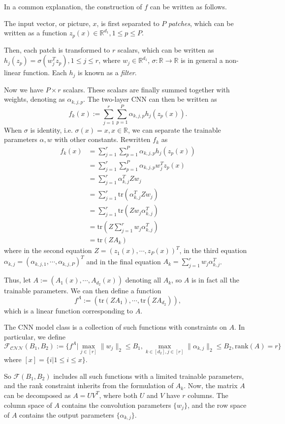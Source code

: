 \documentclass{article}
\begin{document}
In a common explanation, the construction of $f$ can be written as follows.

The input vector, or picture, $x$, is first separated to $P$ \emph{patches}, which can be written as a function $z_p(x)\in\mathbb{R}^{d_1},1\leq p\leq P$.

Then, each patch is transformed to $r$ scalars, which can be written as $h_j(z_p)=\sigma(w_j^Tz_p),1\leq j\leq r$, where $w_j\in\mathbb{R}^{d_1}$, $\sigma:\mathbb{R}\rightarrow\mathbb{R}$ is in general a non-linear function. Each $h_j$ is known as a \emph{filter}.

Now we have $P\times r$ scalars. These scalars are finally summed together with weights, denoting as $\alpha_{k,j,p}$. The two-layer CNN can then be written as
\[f_k(x):=\sum_{j=1}^{r}\sum_{p=1}^{P}\alpha_{k,j,p}h_j(z_p(x)).\]
When $\sigma$ is identity, i.e. $\sigma(x)=x,x\in\mathbb{R}$, we can separate the trainable parameters $\alpha,w$ with other constants. Rewritten $f_k$ as
\begin{align*}
f_k(x)&=\sum_{j=1}^{r}\sum_{p=1}^{P}\alpha_{k,j,p}h_j(z_p(x))\\
&=\sum_{j=1}^{r}\sum_{p=1}^{P}\alpha_{k,j,p}w_j^Tz_p(x)\\
&=\sum_{j=1}^{r}\alpha_{k,j}^TZw_j\\
&=\sum_{j=1}^{r}\text{tr}(\alpha_{k,j}^TZw_j)\\
&=\sum_{j=1}^{r}\text{tr}(Zw_j\alpha_{k,j}^T)\\
&=\text{tr}(Z\sum_{j=1}^{r}w_j\alpha_{k,j}^T)\\
&=\text{tr}(ZA_k)
\end{align*}
where in the second equation $Z=(z_1(x),\cdots,z_P(x))^T$, in the third equation $\alpha_{k,j}=(\alpha_{k,j,1},\cdots,\alpha_{k,j,P})^T$ and in the final equation $A_k=\sum_{j=1}^{r}w_j\alpha_{k,j}^T$.

Thus, let $A:=(A_1(x),\cdots,A_{d_2}(x))$ denoting all $A_k$, so $A$ is in fact all the trainable parameters. We can then define a function \[f^A:=(\text{tr}(ZA_1),\cdots,\text{tr}(ZA_{d_2})),\] which is a linear function corresponding to $A$.

The CNN model class is a collection of such functions with constraints on $A$. In particular, we define
\[\mathcal{F_{\text{CNN}}}(B_1,B_2):=\lbrace f^A|\max_{j\in[r]}\|w_j\|_2\leq B_1, \max_{k\in[d_2],j\in[r]}\|\alpha_{k,j}\|_2\leq B_2,\text{rank}(A)=r \rbrace\]
where $[x]=\lbrace i|1\leq i\leq x\rbrace.$

So $\mathcal{F}(B_1,B_2)$ includes all such functions with a limited trainable parameters, and the rank constraint inherits from the formulation of $A_k$. Now, the matrix $A$ can be decomposed as $A=UV^T$, where both $U$ and $V$ have $r$ columns. The column space of $A$ contains the convolution parameters $\lbrace w_j\rbrace$, and the row space of $A$ contains the output parameters $\lbrace\alpha_{k,j}\rbrace$.
\end{document}
